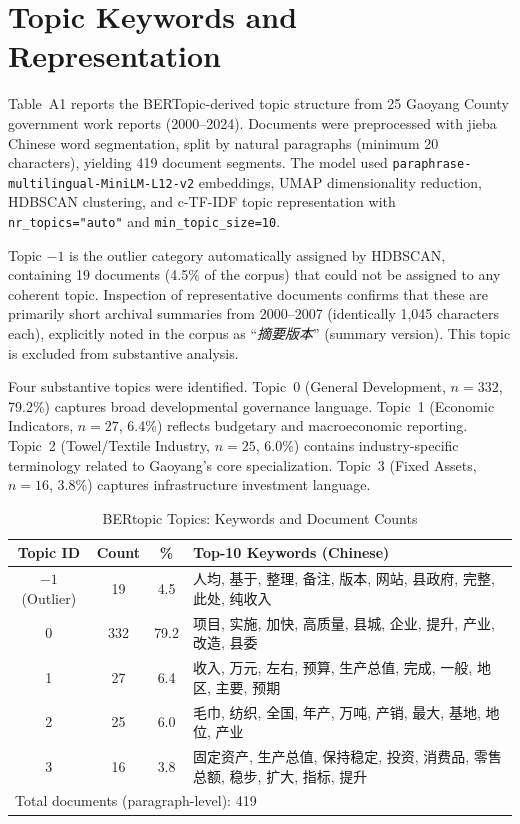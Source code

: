 \documentclass[sustainability,article,submit,moreauthors,pdftex]{mdpi}
\begin{document}
\section{Topic Keywords and Representation}

Table~A1 reports the BERTopic-derived topic structure from 25 Gaoyang County government work reports (2000--2024). Documents were preprocessed with jieba Chinese word segmentation, split by natural paragraphs (minimum 20 characters), yielding 419 document segments. The model used \texttt{paraphrase-multilingual-MiniLM-L12-v2} embeddings, UMAP dimensionality reduction, HDBSCAN clustering, and c-TF-IDF topic representation with \texttt{nr\_topics="auto"} and \texttt{min\_topic\_size=10}.

Topic $-1$ is the outlier category automatically assigned by HDBSCAN, containing 19 documents (4.5\% of the corpus) that could not be assigned to any coherent topic. Inspection of representative documents confirms that these are primarily short archival summaries from 2000--2007 (identically 1,045 characters each), explicitly noted in the corpus as ``\textit{摘要版本}'' (summary version). This topic is excluded from substantive analysis.

Four substantive topics were identified. Topic~0 (General Development, $n=332$, 79.2\%) captures broad developmental governance language. Topic~1 (Economic Indicators, $n=27$, 6.4\%) reflects budgetary and macroeconomic reporting. Topic~2 (Towel/Textile Industry, $n=25$, 6.0\%) contains industry-specific terminology related to Gaoyang's core specialization. Topic~3 (Fixed Assets, $n=16$, 3.8\%) captures infrastructure investment language.

\begin{table}[htbp]
\centering
\caption{BERtopic Topics: Keywords and Document Counts}
\label{tab:A1}
\begin{tabular}{c c c l}
\toprule
Topic ID & Count & \% & Top-10 Keywords (Chinese) \\
\midrule
$-1$ (Outlier) & 19 & 4.5 & 人均, 基于, 整理, 备注, 版本, 网站, 县政府, 完整, 此处, 纯收入 \\
0 & 332 & 79.2 & 项目, 实施, 加快, 高质量, 县城, 企业, 提升, 产业, 改造, 县委 \\
1 & 27 & 6.4 & 收入, 万元, 左右, 预算, 生产总值, 完成, 一般, 地区, 主要, 预期 \\
2 & 25 & 6.0 & 毛巾, 纺织, 全国, 年产, 万吨, 产销, 最大, 基地, 地位, 产业 \\
3 & 16 & 3.8 & 固定资产, 生产总值, 保持稳定, 投资, 消费品, 零售总额, 稳步, 扩大, 指标, 提升 \\
\midrule
\multicolumn{4}{l}{Total documents (paragraph-level): 419} \\
\bottomrule
\end{tabular}
\end{table}
\end{document}
